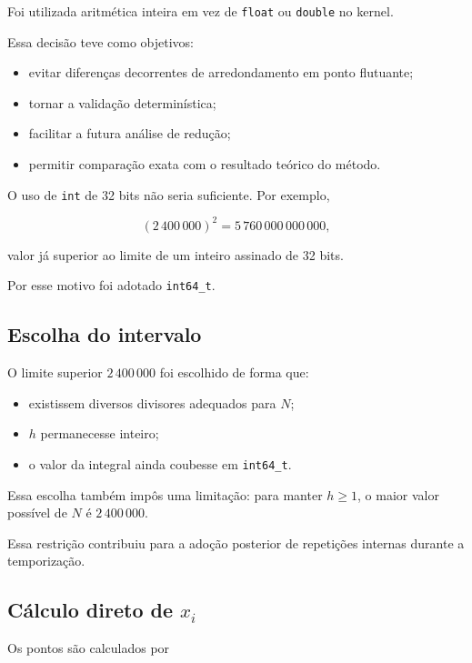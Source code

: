 Foi utilizada aritmética inteira em vez de \texttt{float} ou \texttt{double}
no kernel.

Essa decisão teve como objetivos:

\begin{itemize}
    \item evitar diferenças decorrentes de arredondamento em ponto
    flutuante;
    \item tornar a validação determinística;
    \item facilitar a futura análise de redução;
    \item permitir comparação exata com o resultado teórico do método.
\end{itemize}

O uso de \texttt{int} de 32 bits não seria suficiente. Por exemplo,

\begin{equation}
    (2\,400\,000)^2
    =
    5\,760\,000\,000\,000,
\end{equation}

valor já superior ao limite de um inteiro assinado de 32 bits.

Por esse motivo foi adotado \texttt{int64\_t}.

\subsection{Escolha do intervalo}

O limite superior \(2\,400\,000\) foi escolhido de forma que:

\begin{itemize}
    \item existissem diversos divisores adequados para \(N\);
    \item \(h\) permanecesse inteiro;
    \item o valor da integral ainda coubesse em \texttt{int64\_t}.
\end{itemize}

Essa escolha também impôs uma limitação: para manter \(h\geq1\), o maior
valor possível de \(N\) é \(2\,400\,000\).

Essa restrição contribuiu para a adoção posterior de repetições internas
durante a temporização.

\subsection{Cálculo direto de \(x_i\)}

Os pontos são calculados por

